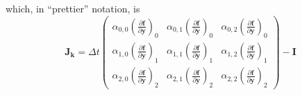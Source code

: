\documentclass[10pt,a4paper]{article}
\newcommand{\bvec}[1]{\mathbf{#1}}
\begin{document}
which, in ``prettier'' notation, is
\begin{equation*}
  \bvec{J}_\bvec{k} = \Delta t \begin{pmatrix}
    \alpha_{0,0}\left( \frac{\partial \bvec{f}}{\partial \bvec{y}} \right)_0 & \alpha_{0,1}\left( \frac{\partial \bvec{f}}{\partial \bvec{y}} \right)_0 & \alpha_{0,2}\left( \frac{\partial \bvec{f}}{\partial \bvec{y}} \right)_0 \\
    \alpha_{1,0}\left( \frac{\partial \bvec{f}}{\partial \bvec{y}} \right)_1 & \alpha_{1,1}\left( \frac{\partial \bvec{f}}{\partial \bvec{y}} \right)_1 & \alpha_{1,2}\left( \frac{\partial \bvec{f}}{\partial \bvec{y}} \right)_1 \\
    \alpha_{2,0}\left( \frac{\partial \bvec{f}}{\partial \bvec{y}} \right)_2 & \alpha_{2,1}\left( \frac{\partial \bvec{f}}{\partial \bvec{y}} \right)_2 & \alpha_{2,2}\left( \frac{\partial \bvec{f}}{\partial \bvec{y}} \right)_2
  \end{pmatrix} - \bvec{I}
\end{equation*}
\end{document}
